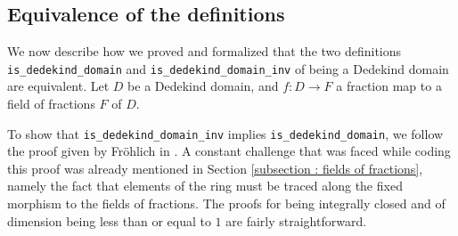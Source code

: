 \documentclass[a4paper,USenglish,cleveref, autoref, thm-restate]{lipics-v2021}
\newcommand{\lean}[1]{\texttt{#1}\xspace} %
\newcommand{\mathlib}{\textsf{mathlib}\xspace}
\begin{document}
%
%
%

\subsection{Equivalence of the definitions} \label{sec:equivalence}
We now describe how we proved and formalized that the two definitions \lean{is\_dedekind\_domain} and \lean{is\_dedekind\_domain\_inv} of being a Dedekind domain are equivalent. Let $D$ be a Dedekind domain, and $f\colon D\to F$ a fraction map to a field of fractions $F$ of $D$.

To show that \lean{is\_dedekind\_domain\_inv} implies \lean{is\_dedekind\_domain}, we follow the proof given by Fr\"ohlich in \cite[Chapter 1, \S~2, ~Proposition 1]{frohlich} . A constant challenge that was faced while coding this proof was already mentioned in Section \ref{subsection : fields of fractions}, namely the fact that elements of the ring must be traced along the fixed morphism to the fields of fractions.%
The proofs for being integrally closed and of dimension being less than or equal to $1$ are fairly straightforward.
\end{document}
